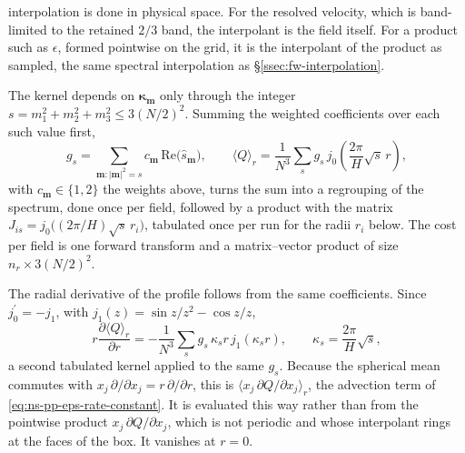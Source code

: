 \documentclass{article}
\begin{document}
interpolation is done in physical space. For the resolved velocity, which is
band-limited to the retained $2/3$ band, the interpolant is the field itself.
For a product such as $\epsilon$, formed pointwise on the grid, it is the
interpolant of the product as sampled, the same spectral interpolation as
\S\ref{ssec:fw-interpolation}.
\par
The kernel depends on $\boldsymbol{\kappa}_{\mathbf{m}}$ only through the
integer $s = m_1^2 + m_2^2 + m_3^2 \le 3 (N/2)^2$. Summing the weighted
coefficients over each such value first,
\begin{equation}\label{eq:radial-group}
  g_s = \sum_{\mathbf{m} : |\mathbf{m}|^2 = s} c_{\mathbf{m}}\,
  \mathrm{Re}\bigl( \hat s_{\mathbf{m}} \bigr),
  \qquad
  \langle Q \rangle_r = \frac{1}{N^3} \sum_{s} g_s\,
  j_0\!\left( \frac{2\pi}{H} \sqrt{s}\, r \right),
\end{equation}
with $c_{\mathbf{m}} \in \{1, 2\}$ the weights above, turns the sum into a
regrouping of the spectrum, done once per field, followed by a product with
the matrix $J_{is} = j_0\bigl( (2\pi/H) \sqrt{s}\, r_i \bigr)$, tabulated once
per run for the radii $r_i$ below. The cost per field is one forward transform
and a matrix--vector product of size $n_r \times 3(N/2)^2$.
\par
The radial derivative of the profile follows from the same coefficients.
Since $j_0^\prime = -j_1$, with $j_1(z) = \sin z / z^2 - \cos z / z$,
\begin{equation}\label{eq:radial-derivative}
  r \frac{\partial \langle Q \rangle_r}{\partial r}
  = -\frac{1}{N^3} \sum_{s} g_s\, \kappa_s r\, j_1(\kappa_s r),
  \qquad \kappa_s = \frac{2\pi}{H} \sqrt{s},
\end{equation}
a second tabulated kernel applied to the same $g_s$. Because the spherical
mean commutes with $x_j\, \partial/\partial x_j = r\, \partial/\partial r$,
this is $\langle x_j\, \partial Q / \partial x_j \rangle_r$, the advection term
of \eqref{eq:ns-pp-eps-rate-constant}. It is evaluated this way rather than from
the pointwise product $x_j\, \partial Q/\partial x_j$, which is not periodic
and whose interpolant rings at the faces of the box. It vanishes at $r = 0$.
\end{document}
